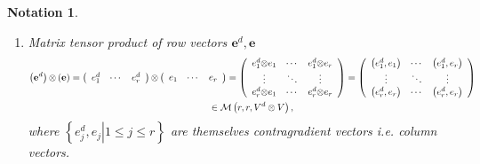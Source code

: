 \documentclass[aps,preprint]{revtex4}%
\newtheorem{notation}[theorem]{Notation}
\begin{document}
\begin{notation}
\begin{enumerate}
\item Matrix tensor product of row vectors $\mathbf{e}^{d}\mathbf{,e}$%
\begin{gather}
\left(  \mathbf{e}^{d}\right)  \mathbf{\otimes}\left(  \mathbf{e}\right)
=\left(
\begin{array}
[c]{ccc}%
e_{1}^{d} & \cdots & e_{r}^{d}%
\end{array}
\right)  \mathbf{\otimes}\left(
\begin{array}
[c]{ccc}%
e_{1} & \cdots & e_{r}%
\end{array}
\right)  =\left(
\begin{array}
[c]{ccc}%
e_{1}^{d}\mathbf{\otimes}e_{1} & \cdots & e_{1}^{d}\mathbf{\otimes}e_{r}\\
\vdots & \ddots & \vdots\\
e_{r}^{d}\mathbf{\otimes}e_{1} & \cdots & e_{r}^{d}\mathbf{\otimes}e_{r}%
\end{array}
\right)  =\left(
\begin{array}
[c]{ccc}%
\left(  e_{1}^{d},e_{1}\right)  & \cdots & \left(  e_{1}^{d},e_{r}\right) \\
\vdots & \ddots & \vdots\\
\left(  e_{r}^{d},e_{r}\right)  & \cdots & \left(  e_{r}^{d},e_{r}\right)
\end{array}
\right) \\
\in\mathcal{M}\left(  r,r,V^{d}\otimes V\right)  ,
\end{gather}
where $\left\{  \left.  e_{j}^{d},e_{j}\right\vert 1\leq j\leq r\right\}  $
are themselves contragradient vectors i.e. column vectors.


\end{enumerate}
\end{notation}
\end{document}
